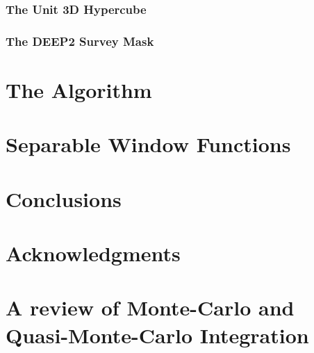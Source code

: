 \documentclass[usenatbib]{mn2e}
\begin{document}
\subsubsection{The Unit 3D Hypercube}

\subsubsection{The DEEP2 Survey Mask}

\section{The Algorithm}

\section{Separable Window Functions}

\section{Conclusions}

\section{Acknowledgments}

\appendix

\section{A review of Monte-Carlo and Quasi-Monte-Carlo Integration}
\end{document}
